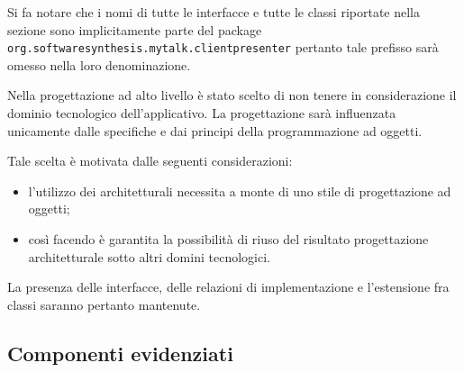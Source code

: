 Si fa notare che i nomi di tutte le interfacce e tutte le classi riportate nella sezione sono implicitamente parte del package \texttt{org.softwaresynthesis.mytalk.clientpresenter} pertanto tale prefisso sarà omesso nella loro denominazione.

Nella progettazione ad alto livello è stato scelto di non tenere in considerazione il dominio tecnologico dell'applicativo. La progettazione sarà influenzata unicamente dalle specifiche e dai principi della programmazione ad oggetti.

Tale scelta è motivata dalle seguenti considerazioni:
\begin{itemize}
   \item l'utilizzo dei  architetturali necessita a monte di uno stile di progettazione ad oggetti;
   \item così facendo è garantita la possibilità di riuso del risultato progettazione architetturale sotto altri domini tecnologici.
\end{itemize}

La presenza delle interfacce, delle relazioni di implementazione e l'estensione fra classi saranno pertanto mantenute.

\subsection{Componenti evidenziati}

